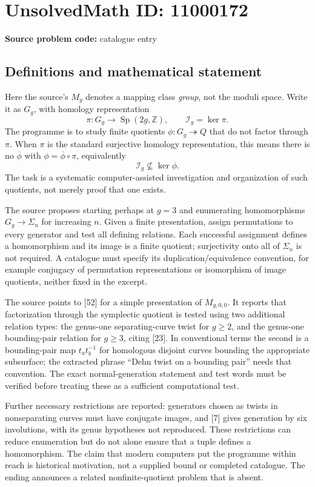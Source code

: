 \documentclass[11pt]{article}
\newcommand{\Z}{\mathbb{Z}}
\begin{document}
\section*{UnsolvedMath ID: 11000172}
\textbf{Source problem code:} catalogue entry
\subsection{Definitions and mathematical statement}
Here the source's \(M_g\) denotes a mapping class \emph{group}, not the moduli space. Write it as \(G_g\), with homology representation
\[\pi:G_g\to\operatorname{Sp}(2g,\Z),\qquad\mathcal I_g=\ker\pi.\]
The programme is to study finite quotients \(\phi:G_g\twoheadrightarrow Q\) that do not factor through \(\pi\). When \(\pi\) is the standard surjective homology representation, this means there is no \(\overline\phi\) with \(\phi=\overline\phi\circ\pi\), equivalently
\[\mathcal I_g\not\subseteq\ker\phi.\]
The task is a systematic computer-assisted investigation and organization of such quotients, not merely proof that one exists.

The source proposes starting perhaps at \(g=3\) and enumerating homomorphisms \(G_g\to\Sigma_n\) for increasing \(n\). Given a finite presentation, assign permutations to every generator and test all defining relations. Each successful assignment defines a homomorphism and its image is a finite quotient; surjectivity onto all of \(\Sigma_n\) is not required. A catalogue must specify its duplication/equivalence convention, for example conjugacy of permutation representations or isomorphism of image quotients, neither fixed in the excerpt.

The source points to [52] for a simple presentation of \(M_{g,0,0}\). It reports that factorization through the symplectic quotient is tested using two additional relation types: the genus-one separating-curve twist for \(g\geq2\), and the genus-one bounding-pair relation for \(g\geq3\), citing [23]. In conventional terms the second is a bounding-pair map \(t_a t_b^{-1}\) for homologous disjoint curves bounding the appropriate subsurface; the extracted phrase ``Dehn twist on a bounding pair'' needs that convention. The exact normal-generation statement and test words must be verified before treating these as a sufficient computational test.

Further necessary restrictions are reported: generators chosen as twists in nonseparating curves must have conjugate images, and [7] gives generation by six involutions, with its genus hypotheses not reproduced. These restrictions can reduce enumeration but do not alone ensure that a tuple defines a homomorphism. The claim that modern computers put the programme within reach is historical motivation, not a supplied bound or completed catalogue. The ending announces a related nonfinite-quotient problem that is absent.
\end{document}
